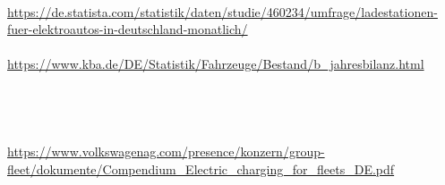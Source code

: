 \documentclass[12pt,a4paper]{article}
\begin{document}
\begin{parcolumns}[colwidths={1=2.5 cm, 2=10 cm, 3=2.5cm}]{3}
{\begin{tiny}
\\\\\\\\\\\\\\\\\\\\\\\\\\\\\\\\\\\\\\\\\\\\\\\url{https://de.statista.com/statistik/daten/studie/460234/umfrage/ladestationen-fuer-elektroautos-in-deutschland-monatlich/}\\ \\ \url{https://www.kba.de/DE/Statistik/Fahrzeuge/Bestand/b_jahresbilanz.html} \\ \\ \\ \\ \\ \url{https://www.volkswagenag.com/presence/konzern/group-fleet/dokumente/Compendium_Electric_charging_for_fleets_DE.pdf}
\end{tiny}}
\end{parcolumns}
\end{document}
